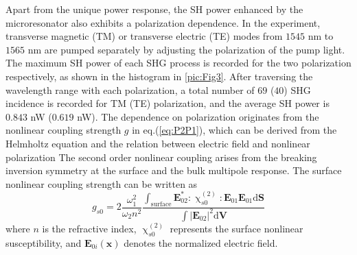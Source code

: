 \documentclass[a4paper,8pt,hyperref, twocolumn]{article}
\begin{document}





Apart from the unique power response, the SH power enhanced by the microresonator also exhibits a polarization dependence. 
In the experiment, transverse magnetic (TM) or transverse electric (TE) modes from $1545$ nm to $1565$ nm are pumped separately by adjusting the polarization of the pump light. 
The maximum SH power of each SHG process is recorded for the two polarization respectively, as shown in the histogram in \ref{pic:Fig3}. 
After traversing the wavelength range with each polarization, a total number of $69$ ($40$) SHG incidence is recorded for TM (TE) polarization, and the average SH power is $0.843$ nW ($0.619$ nW). 
The dependence on polarization originates from the %
nonlinear coupling strength $g$ in eq.(\ref{eq:P2P1}), which can be derived from the Helmholtz equation and the relation between electric field and nonlinear polarization%
The second order nonlinear coupling arises from the breaking inversion symmetry at the surface and the bulk multipole response. The surface nonlinear coupling strength can be written as
\begin{equation}
g_{s0} = 2\frac{\omega_1^2}{\omega_2n^2}\frac{\int_{\mathrm{surface} } \mathbf{E}_{02}^*:\upchi^{(2)}_{s0}:\mathbf{E}_{01}\mathbf{E}_{01} \mathrm{d}	\mathbf{S}}{\int |\mathbf{E}_{02}|^2 \mathrm{d}	\mathbf{V}}
\end{equation}
where $n$ is the refractive index, $\upchi^{(2)}_{s0}$ represents the surface nonlinear susceptibility, and $\mathbf{E}_{0i}(\mathbf{x})$ denotes the  normalized electric field. %
\end{document}
